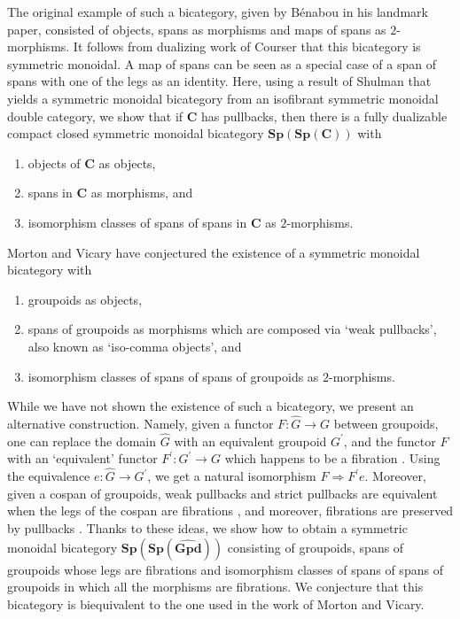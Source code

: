 \documentclass[11pt]{amsart}
\newcommand{\cat}[1]{\mathbf{#1}}
\theoremstyle{remark}
\theoremstyle{definition}
\begin{document}
The original example of such a bicategory, given by B\'enabou \cite{Be} in his landmark paper, consisted of objects, spans as morphisms and maps of spans as $2$-morphisms. It follows from dualizing work of Courser \cite{Cour} that this bicategory is symmetric monoidal. A map of spans can be seen as a special case of a span of spans with one of the legs as an identity. Here, using a result of Shulman \cite{Shul} that yields a symmetric monoidal bicategory from an isofibrant symmetric monoidal double category, we show that if $\cat{C}$ has pullbacks, then there is a fully dualizable compact closed symmetric monoidal bicategory $\cat{Sp(Sp(C))}$ with
\begin{enumerate}
\item{objects of $\cat{C}$ as objects,}
\item{spans in $\cat{C}$ as morphisms, and}
\item{isomorphism classes of spans of spans in $\cat{C}$ as $2$-morphisms.}
\end{enumerate}

Morton and Vicary \cite{MortVic} have conjectured the existence of a symmetric monoidal bicategory with
\begin{enumerate}
\item{groupoids as objects,}
\item{spans of groupoids as morphisms which are composed via `weak pullbacks', also known as `iso-comma objects', and}
\item{isomorphism classes of spans of spans of groupoids as $2$-morphisms.}
\end{enumerate}
While we have not shown the existence of such a bicategory, we present an alternative construction. Namely, given a functor $F \colon \hat{G} \to G$ between groupoids, one can replace the domain $\hat{G}$ with an equivalent groupoid $G^\prime$, and the functor $F$ with an `equivalent' functor $F^\prime \colon G^\prime \to G$ which happens to be a fibration \cite{Anderson,Bousfield,Strickland}. Using the equivalence $e \colon \hat{G} \to G^\prime$, we get a natural isomorphism $F \Rightarrow F^\prime e$. Moreover, given a cospan of groupoids, weak pullbacks and strict pullbacks are equivalent when the legs of the cospan are fibrations \cite{JoyalStreet1}, and moreover, fibrations are preserved by pullbacks \cite{Brown,Heath}. Thanks to these ideas, we show how to obtain a symmetric monoidal bicategory $\cat{Sp(Sp(\widehat{Gpd}))}$ consisting of groupoids, spans of groupoids whose legs are fibrations and isomorphism classes of spans of spans of groupoids in which all the morphisms are fibrations. We conjecture that this bicategory is biequivalent to the one used in the work of Morton and Vicary.
\end{document}

